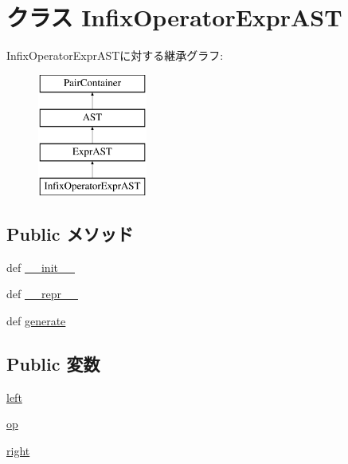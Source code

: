 \hypertarget{classslicc_1_1ast_1_1OperatorExprAST_1_1InfixOperatorExprAST}{
\section{クラス InfixOperatorExprAST}
\label{classslicc_1_1ast_1_1OperatorExprAST_1_1InfixOperatorExprAST}
}
InfixOperatorExprASTに対する継承グラフ:\begin{figure}[H]
\begin{center}
\leavevmode
\includegraphics[height=4cm]{classslicc_1_1ast_1_1OperatorExprAST_1_1InfixOperatorExprAST}
\end{center}
\end{figure}
\subsection*{Public メソッド}
\begin{DoxyCompactItemize}
\item 
def \hyperlink{classslicc_1_1ast_1_1OperatorExprAST_1_1InfixOperatorExprAST_ac775ee34451fdfa742b318538164070e}{\_\-\_\-init\_\-\_\-}
\item 
def \hyperlink{classslicc_1_1ast_1_1OperatorExprAST_1_1InfixOperatorExprAST_ad8b9328939df072e4740cd9a63189744}{\_\-\_\-repr\_\-\_\-}
\item 
def \hyperlink{classslicc_1_1ast_1_1OperatorExprAST_1_1InfixOperatorExprAST_a4555d1cee0dccf3942ea35fe86de2e8e}{generate}
\end{DoxyCompactItemize}
\subsection*{Public 変数}
\begin{DoxyCompactItemize}
\item 
\hyperlink{classslicc_1_1ast_1_1OperatorExprAST_1_1InfixOperatorExprAST_a58c76f848f15df202254c1daec468567}{left}
\item 
\hyperlink{classslicc_1_1ast_1_1OperatorExprAST_1_1InfixOperatorExprAST_a99a30df0f2488360cdd46b4b88e5f5f0}{op}
\item 
\hyperlink{classslicc_1_1ast_1_1OperatorExprAST_1_1InfixOperatorExprAST_a25331d5f9601b8cb1ce57490930d7c01}{right}
\end{DoxyCompactItemize}



